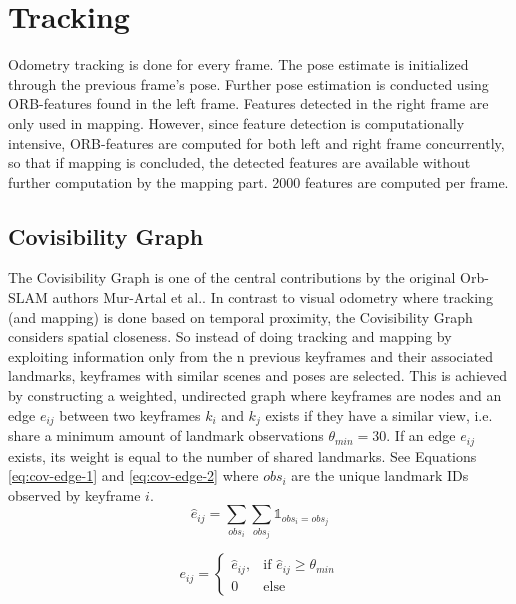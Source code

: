 \documentclass[a4paper, 10pt]{article}
\begin{document}
\section{Tracking}
\label{sec:orgbad49d1}
Odometry tracking is done for every frame. The pose estimate is initialized through the previous frame’s pose. Further pose estimation is conducted using ORB-features found in the left frame.
Features detected in the right frame are only used in mapping. However, since feature detection is computationally intensive, ORB-features are computed for both left and right frame concurrently, 
so that if mapping is concluded, the detected features are available without further computation by the mapping part. 2000 features are computed per frame. 

\subsection{Covisibility Graph}
\label{sec:org1271aa4}

The Covisibility Graph is one of the central contributions by the original Orb-SLAM authors Mur-Artal et al.. In contrast to visual odometry where tracking (and mapping) is done based on temporal proximity, the Covisibility Graph 
considers spatial closeness.
So instead of doing tracking and mapping by exploiting information only from the n previous keyframes and their associated landmarks, keyframes with similar scenes and poses are selected.
This is achieved by constructing a weighted, undirected graph where keyframes are nodes and an edge \(e_{ij}\) between two keyframes \(k_i\) and \(k_j\) exists if they have a similar view, 
i.e. share a minimum amount of landmark observations \(\theta_{min}=30\).
If an edge \(e_{ij}\) exists, its weight is equal to the number of shared landmarks. See Equations \ref{eq:cov-edge-1} and \ref{eq:cov-edge-2} where \(obs_i\) are the unique landmark IDs observed by keyframe \(i\).
\begin{equation}
\label{eq:cov-edge-1}
\widehat{e}_{ij} = \sum_{obs_i}\sum_{obs_j}\mathbb{1}_{obs_i=obs_j}
\end{equation}

\begin{equation}
\label{eq:cov-edge-2}
e_{ij} = 
\begin{cases}
\widehat{e}_{ij}, & \text{if } \widehat{e}_{ij} \geq \theta_{min} \\
0 & \text{else}
\end{cases}
\end{equation}
\end{document}
